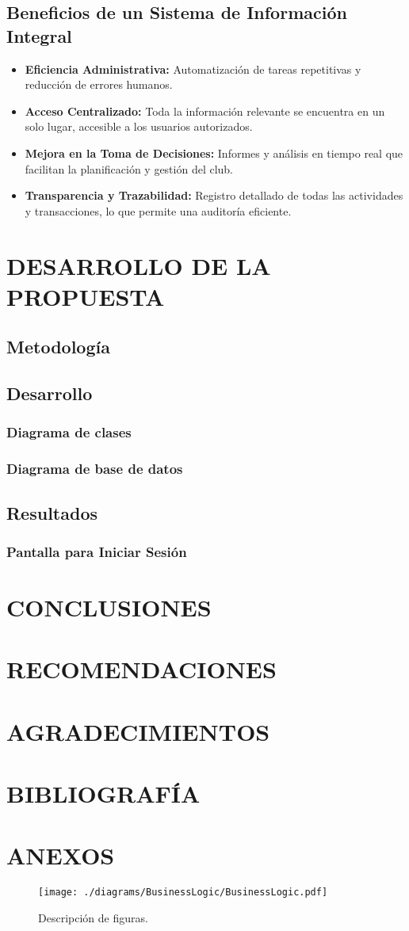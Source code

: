 \documentclass[stu, 12pt, letterpaper, donotrepeattitle, floatsintext, natbib]{apa7}
\begin{document}
\subsection{Beneficios de un Sistema de Informaci\'on Integral}
\begin{itemize}
    \item \textbf{Eficiencia Administrativa: }Automatizaci\'on de tareas repetitivas y reducci\'on de errores humanos.
    \item \textbf{Acceso Centralizado: }Toda la informaci\'on relevante se encuentra en un solo lugar, accesible a los usuarios autorizados.
    \item \textbf{Mejora en la Toma de Decisiones: }Informes y an\'alisis en tiempo real que facilitan la planificaci\'on y gesti\'on del club.
    \item \textbf{Transparencia y Trazabilidad: }Registro detallado de todas las actividades y transacciones, lo que permite una auditor\'ia eficiente.
\end{itemize}

\section{\large DESARROLLO DE LA PROPUESTA}
\subsection{Metodolog\'ia}
\subsection{Desarrollo}
\subsubsection{Diagrama de clases}
\subsubsection{Diagrama de base de datos}
\subsection{Resultados}
\subsubsection{Pantalla para Iniciar Sesi\'on}
\section{\large CONCLUSIONES}
\section{\large RECOMENDACIONES}
\section{\large AGRADECIMIENTOS}
\section{\large BIBLIOGRAF\'IA}
\section{\large ANEXOS}
\begin{figure}
    \caption{Descripci\'on de figuras.}
    \texttt{[image: ./diagrams/BusinessLogic/BusinessLogic.pdf]}
\end{figure}
\end{document}
